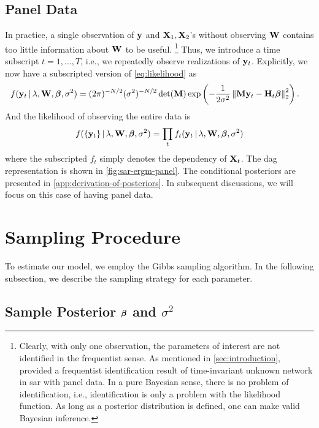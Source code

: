 \documentclass[a4paper]{article}
\begin{document}
\subsection{Panel Data}

In practice,
a single observation of $\mathbf{y}$ and $\mathbf{X}_{1},\mathbf{X}_{2}$'s without observing $\mathbf{W}$
contains too little information about $\mathbf{W}$ to be useful.
\footnote{
	Clearly, with only one observation, the parameters of interest are not identified in the frequentist sense.
	As mentioned in \autoref{sec:introduction},
	\cite{de_paula-2023} provided a frequentist identification result
	of time-invariant unknown network in \gls{sar} with panel data.
	In a pure Bayesian sense,
	there is no problem of identification,
	i.e., identification is only a problem with the likelihood function.
	As long as a posterior distribution is defined,
	one can make valid Bayesian inference.
}
Thus, we introduce a time subscript $t=1,...,T$, i.e., we repeatedly observe realizations of $\mathbf{y}_{t}$.
Explicitly, we now have a subscripted version of \eqref{eq:likelihood} as
\begin{align*}
	f(\mathbf{y}_{t}\,|\,\lambda,\mathbf{W},\boldsymbol{\beta},\sigma^2)
	&=
	(2\pi)^{-N/2}
	(\sigma^2)^{-N/2}
	\det(\mathbf{M})
	\exp \left( -\frac1{2\sigma^2} \left\|\mathbf{M}\mathbf{y}_{t}-\mathbf{H}_{t}\boldsymbol{\beta}\right\|_{2}^{2} \right).
\end{align*}
And the likelihood of observing the entire data is
\begin{align*}
	f(\{\mathbf{y}_{t}\}\,|\,\lambda,\mathbf{W},\boldsymbol{\beta},\sigma^2)
	= \prod_{t} f_t(\mathbf{y}_{t}\,|\,\lambda,\mathbf{W},\boldsymbol{\beta},\sigma^2)
\end{align*}
where the subscripted $f_t$ simply denotes the dependency of $\mathbf{X}_t$.
The \gls{dag} representation is shown in \autoref{fig:sar-ergm-panel}.
The conditional posteriors are presented in \autoref{app:derivation-of-posteriors}.
In subsequent discussions, we will focus on this case of having panel data.

\section{Sampling Procedure}\label{sec:sampling-procedure}

To estimate our model, we employ the Gibbs sampling algorithm.
In the following subsection, we describe the sampling strategy for each parameter.



\subsection{Sample Posterior \texorpdfstring{$\boldsymbol{\beta}$}{beta} and \texorpdfstring{$\sigma^2$}{sigma-squared}}
\end{document}
